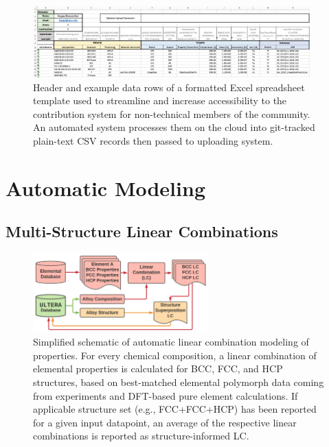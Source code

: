 \todo



\begin{figure}[H]
    \centering
    \includegraphics[width=0.95\textwidth]{ultera/ULTERA_Contribute.png}
    \caption{Header and example data rows of a formatted Excel spreadsheet template used to streamline and increase accessibility to the contribution system for non-technical members of the community. An automated system processes them on the cloud into git-tracked plain-text CSV records then passed to uploading system.}
    \label{ultera:fig:contributiontemplate}
\end{figure}




\section{Automatic Modeling} \label{ultera:sec:automodel}

\subsection{Multi-Structure Linear Combinations} \label{ultera:ssec:autolc}

\cite{Chong2021CorrelationAlloys}

\begin{figure}[H]
    \centering
    \includegraphics[width=0.6\textwidth]{ultera/ULTERA_ElementalDatabase_LC_V1.png}
    \caption{Simplified schematic of automatic linear combination modeling of properties. For every chemical composition, a linear combination of elemental properties is calculated for BCC, FCC, and HCP structures, based on best-matched elemental polymorph data coming from experiments and DFT-based pure element calculations. If applicable structure set (e.g., FCC+FCC+HCP) has been reported for a given input datapoint, an average of the respective linear combinations is reported as structure-informed LC.}
    \label{ultera:fig:autolc}
\end{figure}




